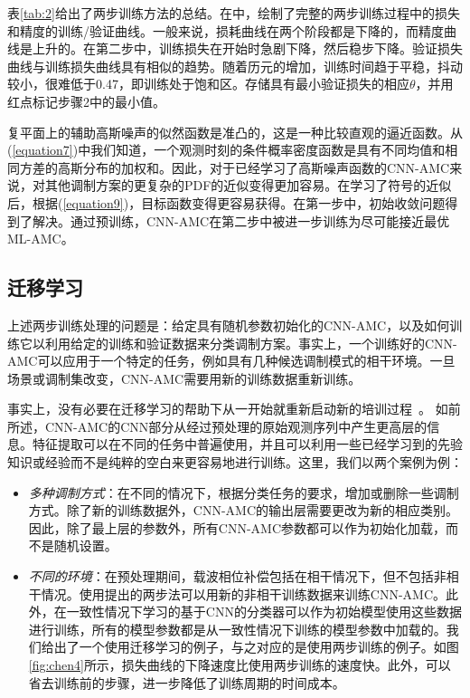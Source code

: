 \documentclass[final]{cvpr}
\begin{document}
 表\ref{tab:2}给出了两步训练方法的总结。在中，绘制了完整的两步训练过程中的损失和精度的训练/验证曲线。一般来说，损耗曲线在两个阶段都是下降的，而精度曲线是上升的。在第二步中，训练损失在开始时急剧下降，然后稳步下降。验证损失曲线与训练损失曲线具有相似的趋势。随着历元的增加，训练时间趋于平稳，抖动较小，很难低于0.47，即训练处于饱和区。存储具有最小验证损失的相应$\theta$，并用红点标记步骤2中的最小值。

复平面上的辅助高斯噪声的似然函数是准凸的，这是一种比较直观的逼近函数。从(\ref{equation7})中我们知道，一个观测时刻的条件概率密度函数是具有不同均值和相同方差的高斯分布的加权和。因此，对于已经学习了高斯噪声函数的CNN-AMC来说，对其他调制方案的更复杂的PDF的近似变得更加容易。在学习了符号的近似后，根据(\ref{equation9})，目标函数变得更容易获得。在第一步中，初始收敛问题得到了解决。通过预训练，CNN-AMC在第二步中被进一步训练为尽可能接近最优ML-AMC。
\subsection{迁移学习}\label{Transfer Learning}
上述两步训练处理的问题是：给定具有随机参数初始化的CNN-AMC，以及如何训练它以利用给定的训练和验证数据来分类调制方案。事实上，一个训练好的CNN-AMC可以应用于一个特定的任务，例如具有几种候选调制模式的相干环境。一旦场景或调制集改变，CNN-AMC需要用新的训练数据重新训练。

事实上，没有必要在迁移学习的帮助下从一开始就重新启动新的培训过程~\cite{r38}。
如前所述，CNN-AMC的CNN部分从经过预处理的原始观测序列中产生更高层的信息。特征提取可以在不同的任务中普遍使用，并且可以利用一些已经学习到的先验知识或经验而不是纯粹的空白来更容易地进行训练。这里，我们以两个案例为例：
\begin{itemize}
\item \textit{多种调制方式}：在不同的情况下，根据分类任务的要求，增加或删除一些调制方式。除了新的训练数据外，CNN-AMC的输出层需要更改为新的相应类别。
因此，除了最上层的参数外，所有CNN-AMC参数都可以作为初始化加载，而不是随机设置。
\item \textit{不同的环境}：在预处理期间，载波相位补偿包括在相干情况下，但不包括非相干情况。使用提出的两步法可以用新的非相干训练数据来训练CNN-AMC。此外，在一致性情况下学习的基于CNN的分类器可以作为初始模型使用这些数据进行训练，所有的模型参数都是从一致性情况下训练的模型参数中加载的。我们给出了一个使用迁移学习的例子，与之对应的是使用两步训练的例子。如图\ref{fig:chen4}所示，损失曲线的下降速度比使用两步训练的速度快。此外，可以省去训练前的步骤，进一步降低了训练周期的时间成本。
\end{itemize}
\end{document}
